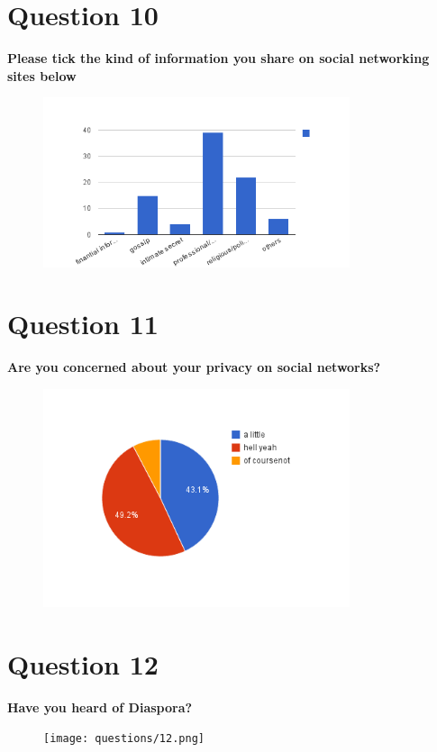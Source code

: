 \documentclass[11pt]{book}
\begin{document}
\chapter{Question 10}
\textbf{Please tick the kind of information you share on social networking sites below
}
\begin{figure}[ht!]
	\centering
	\includegraphics[width=90mm]{questions/10.png}
	\label{overflow}
\end{figure}

\newpage
\chapter{Question 11}
\textbf{Are you concerned about your privacy on social networks?
}
\begin{figure}[ht!]
	\centering
	\includegraphics[width=90mm]{questions/11.png}
	\label{overflow}
\end{figure}

\newpage
\chapter{Question 12}
\textbf{Have you heard of Diaspora?
}
\begin{figure}[ht!]
	\centering
	\texttt{[image: questions/12.png]}
	\label{overflow}
\end{figure}

\newpage
\end{document}
